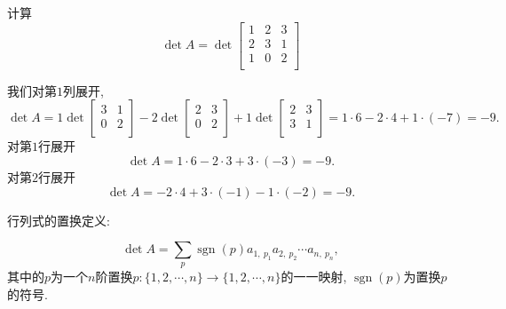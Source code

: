 \begin{example}
    计算
    \begin{equation}
      \det A = \det
      \begin{bmatrix}
       1 & 2 & 3\\
       2 & 3 & 1\\
       1 & 0 & 2\\
      \end{bmatrix}
    \end{equation}
    
    我们对第$1$列展开,
    \begin{equation}
        \det A = 1 \det \begin{bmatrix}
         3 & 1\\
         0 & 2\\
        \end{bmatrix} - 2 \det \begin{bmatrix}
         2 & 3\\
         0 & 2\\
        \end{bmatrix} + 1 \det \begin{bmatrix}
            2 & 3\\
            3 & 1\\
        \end{bmatrix} = 1 \cdot 6 - 2 \cdot 4 + 1 \cdot \left( -7 \right) = -9.
    \end{equation}
    对第$1$行展开
    \begin{equation}
      \det A = 1 \cdot 6 - 2\cdot 3 + 3 \cdot \left( -3 \right) = -9.
    \end{equation}
    对第$2$行展开
    \begin{equation}
        \det A = - 2 \cdot 4 + 3 \cdot \left( -1 \right) - 1 \cdot \left( -2 \right) = -9.
    \end{equation}
\end{example}

行列式的置换定义:

\begin{equation}
  \det A = \sum_{p} \operatorname{sgn} \left( p \right) a_{1,\  p_1} a_{2,\  p_2} \cdots a_{n,\  p_n},
\end{equation}
其中的$p$为一个$n$阶置换$p\colon \{ 1,2, \cdots , n \} \to \{ 1,2, \cdots , n \} $的一一映射, $\operatorname{sgn} \left( p \right)$为置换$p$的符号.

